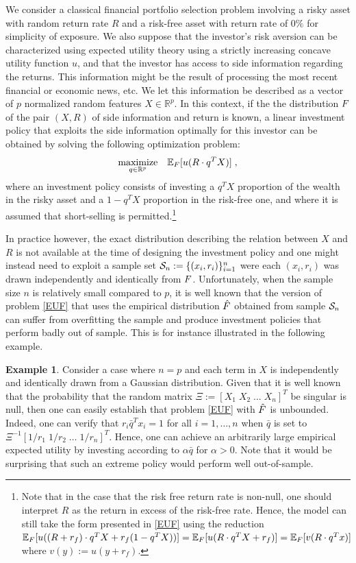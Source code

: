 \documentclass[]{interact}
\theoremstyle{plain}%
\theoremstyle{definition}
\theoremstyle{remark}
\def\Expect{{\mathbb E}}
\def\maximize{\mathop{\rm maximize}}
\newcommand{\0}{\V{0}}
\newcommand{\1}{\V{1}}
\renewcommand{\Re}{\mathbb{R}}
\newcommand{\modified}[1]{{\color{blue} #1}}
\theoremstyle{plain}
\theoremstyle{definition}
\newtheorem*{ex}{Example}
\begin{document}
We consider a classical financial portfolio selection problem involving a risky asset with
random return rate $R$ and a risk-free asset with return rate of $0\%$ for simplicity of exposure. We
also suppose that the investor's risk aversion can be characterized using expected utility
theory using a strictly increasing concave utility function $u$, and that the investor has
access to side information regarding the returns. This information might be the result of
processing the most recent financial or economic news, etc. We let this information be
described as a vector of $p$ normalized random features $X\in\Re^p$. In this
context, if the the distribution $F$ of the pair $(X,R)$ of side information and return
is known, a linear investment policy that exploits the side information optimally for this
investor can be obtained by solving the following optimization problem:
\begin{equation}
\maximize_{q\in\Re^p}\;\;\;\Expect_\F[u(R\cdot q^TX)]\;,\label{EUF}
\end{equation}
\modified{where an investment policy consists of investing a $q^T X$ proportion of the wealth in the risky asset and a $1-q^T X$ proportion in the risk-free one,} and where it is assumed that short-selling is permitted.\footnote{\modified{Note that in the case that the risk free return rate is non-null, one should interpret $R$ as the return in excess of the risk-free rate. Hence, the model can still take the form presented in \eqref{EUF} using the reduction $\Expect_\F[u((R+r_f)\cdot q^T X + r_f(1-q^T X))]=\Expect_\F[u(R\cdot q^T X + r_f)]=\Expect_\F[v(R\cdot q^T x)]$ where $v(y):=u(y + r_f)$.} }

In practice however, the exact distribution describing the relation between $X$ and $R$ is
not available at the time of designing the investment policy and one might instead need to
exploit a sample set $\mathcal{S}_n:=\{(x_i,r_i)\}_{i=1}^n$ were each $(x_i,r_i)$ was drawn independently and identically from
$F$. Unfortunately, when the sample size $n$ is relatively small compared to $p$, it is
well known that the version of problem \eqref{EUF} that uses the empirical distribution ${\hat{F}}$ obtained
from sample $\mathcal{S}_n$ can suffer from overfitting the sample and produce investment policies that
perform badly out of sample. This is for instance illustrated in the following example.

\begin{ex}
  Consider a case where $n=p$ and each term in $X$ is \modified{independently} and
  identically drawn from a Gaussian distribution. Given that it is well known that the
  probability that the random matrix \modified{$\Xi := [X_1\;X_2\;\dots\;X_n]^T$} be singular is null,
  then one can easily establish that problem \eqref{EUF} with ${\hat{F}}$ is
  unbounded. Indeed, one can verify that $r_i \bar{q}^T x_i = 1$ for all $i=1,\dots,n$
  when $\bar{q}$ is set to \modified{${\Xi^{-1}}[1/r_1\;1/r_2\;\dots\;1/r_n]^T$}. Hence, one can
  achieve an arbitrarily large empirical expected utility by investing according to
  $\alpha\bar{q}$ for $\alpha>0$. Note that it would be surprising that such an extreme policy would perform well out-of-sample.
\end{ex}
\end{document}
